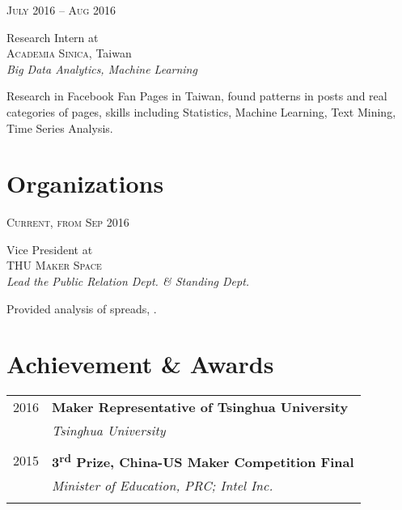 \documentclass[10pt]{article} %
\begin{document}
{\begin{minipage}[t]{0.5\textwidth}
{\raggedleft\textsc{July 2016 -- Aug 2016}\par} 

{\raggedright\large Research Intern at \\ \textsc{Academia Sinica}, Taiwan\\
\textit{Big Data Analytics, Machine Learning}\\[5pt]}

\normalsize{Research in Facebook Fan Pages in Taiwan, found patterns in posts and real categories of pages, skills including Statistics, Machine Learning, Text Mining, Time Series Analysis.}\\


\section{Organizations}

{\raggedleft\textsc{Current, from Sep 2016}\par}

{\raggedright\large Vice President at \\ \textsc{THU Maker Space}
\\
\textit{Lead the Public Relation Dept. \& Standing Dept.}\\[5pt]}

\normalsize{Provided analysis of spreads, .}\\



\section{Achievement \& Awards} 

\begin{tabular}{rl}
2016	 & \textbf{Maker Representative of Tsinghua University}\\
& \textit{Tsinghua University}\\ \\

2015	 & \textbf{3\textsuperscript{rd} Prize, China-US Maker Competition Final}\\
& \textit{Minister of Education, PRC; Intel Inc.}\\ \\


\end{tabular}
\end{minipage}}
\end{document}
